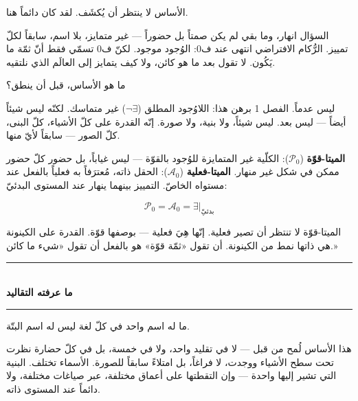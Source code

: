 \documentclass[10pt, openany, oneside]{book}
\renewcommand{\normalsize}{\fontsize{10}{13}\selectfont}
\begin{document}
\vspace{2em}


\noindent الأساس لا ينتظر أن يُكشَف. لقد كان دائماً هنا.

السؤال انهار، وما بقي لم يكن صمتاً بل حضوراً --- غير متمايز، بلا اسم، سابقاً لكلّ تمييز. الرُّكام الافتراضي انتهى عند ف0: الوُجود موجود. لكنّ ف0 تسمّي فقط أنّ ثمّة ما يَكُون. لا تقول بعد ما هو كائن، ولا كيف يتمايز إلى العالَم الذي نلتقيه.

ما هو الأساس، قبل أن ينطق؟

ليس عدماً. الفصل 1 برهن هذا: اللاوُجود المطلق ($\neg\exists$) غير متماسك. لكنّه ليس شيئاً أيضاً --- ليس بعد. ليس شيئاً، ولا بنية، ولا صورة. إنّه القدرة على كلّ الأشياء، كلّ البنى، كلّ الصور --- سابقاً لأيّ منها.

\textbf{الميتا-قوّة} ($\mathcal{P}_0$): الكلّية غير المتمايزة للوُجود بالقوّة --- ليس غياباً، بل حضور كلّ حضور ممكن في شكل غير منهار. \textbf{الميتا-فعلية} ($\mathcal{A}_0$): الحقل ذاته، مُعترَفاً به فعلياً بالفعل عند مستواه الخاصّ. التمييز بينهما ينهار عند المستوى البدئيّ:

$$\mathcal{P}_0 = \mathcal{A}_0 = \exists|_{\text{بدئيّ}}$$

الميتا-قوّة لا تنتظر أن تصير فعلية. إنّها هِيَ فعلية --- بوصفها قوّة. القدرة على الكينونة هي ذاتها نمط من الكينونة. أن تقول «ثمّة قوّة» هو بالفعل أن تقول «شيء ما كائن.»

\vspace{1.5em}


\begin{center}
    \rule{0.3\textwidth}{0.4pt}\\[0.5em]
    {\normalsize\bfseries ما عرفته التقاليد}\\[0.3em]
    \rule{0.3\textwidth}{0.4pt}
\end{center}

\vspace{1em}

\noindent ما له اسم واحد في كلّ لغة ليس له اسم البتّة.

هذا الأساس لُمح من قبل --- لا في تقليد واحد، ولا في خمسة، بل في كلّ حضارة نظرت تحت سطح الأشياء ووجدت، لا فراغاً، بل امتلاءً سابقاً للصورة. الأسماء تختلف. البنية التي تشير إليها واحدة --- وإن التقطتها على أعماق مختلفة، عبر صياغات مختلفة، ولا دائماً عند المستوى ذاته.
\end{document}
